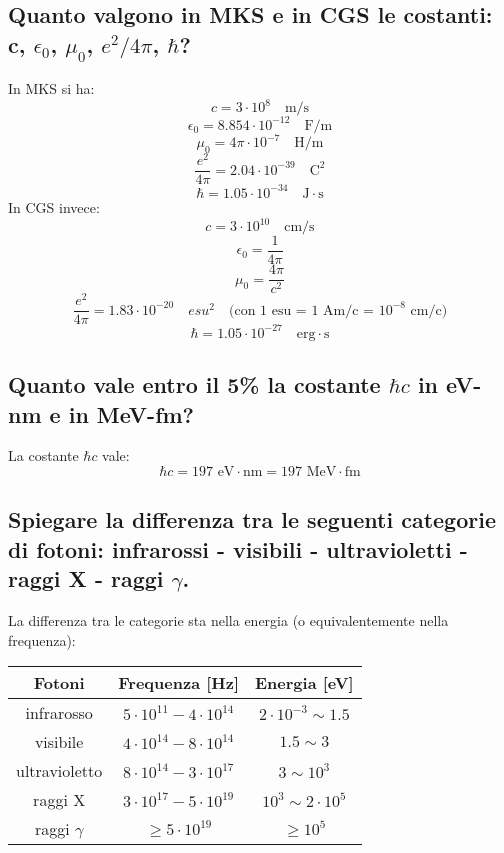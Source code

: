 \subsection[]{ Quanto valgono in MKS e in CGS le costanti: c, $\epsilon_0$,  $\mu_0$, $e^2/4\pi$,  $\hbar$?} 
In MKS si ha:
\[
	c = 3 \cdot 10^{8} \quad \text{m/s}
\] 
\[
	\epsilon_0 = 8.854 \cdot 10^{-12} \quad \text{F/m}
\]
\[
	\mu_0 = 4\pi \cdot 10^{-7} \quad \text{H/m}
\] 
\[
	\frac{e^{2}}{4\pi} = 2.04 \cdot 10^{-39} \quad \text{C}^{2}
\] 
\[
	\hbar = 1.05 \cdot 10^{-34} \quad \text{J} \cdot \text{s}
\] 
In CGS invece:
\[
	c = 3 \cdot 10^{10} \quad \text{cm/s}
\] 
\[
	\epsilon_0 = \frac{1}{4\pi}
\]
\[
	\mu_0 = \frac{4\pi}{c^{2}} 
\] 
\[
	\frac{e^{2}}{4\pi} = 1.83 \cdot 10^{-20} \quad esu^{2} \quad \text{(con 1 esu = 1 Am/c = $10^{-8}$ cm/c)} 
\] 
\[
	\hbar = 1.05 \cdot 10^{-27} \quad \text{erg} \cdot \text{s}
\]

\subsection[]{Quanto vale entro il 5\% la costante $\hbar c$ in eV-nm e in MeV-fm?}
La costante $\hbar c$ vale:
\[
\hbar c = 197 \text{ eV}\cdot \text{nm} = 197 \text{ MeV}\cdot\text{fm}
\]  

\subsection[]{Spiegare la differenza tra le seguenti categorie di fotoni: infrarossi - visibili - ultravioletti - raggi X - raggi $\gamma$. } 
La differenza tra le categorie sta nella energia (o equivalentemente nella frequenza):
\begin{table}[H]
	\centering
	\label{tab: fotoni}
	\begin{tabular}{ccc}
		Fotoni & Frequenza [Hz] & Energia [eV] \\
		\hline
		infrarosso & $5 \cdot 10^{11} - 4 \cdot 10^{14}$ & $2 \cdot 10^{-3} \sim 1.5$  \\
		visibile & $4 \cdot 10^{14} - 8 \cdot 10^{14}$ & $1.5 \sim  3$ \\
		ultravioletto & $8 \cdot 10^{14} - 3 \cdot 10^{17}$ & $3 \sim 10^3$ \\
		raggi X & $3 \cdot 10^{17} - 5 \cdot 10^{19}$ & $ 10^3 \sim 2 \cdot 10^{5} $ \\
		raggi $\gamma$ & $\ge 5 \cdot 10^{19}$ & $\ge 10^5$
	\end{tabular}
\end{table}

